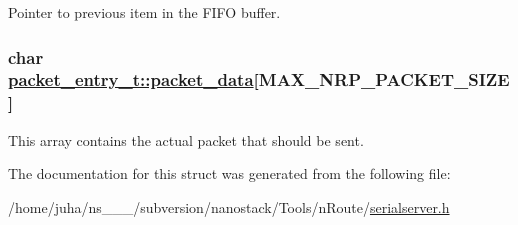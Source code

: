 Pointer to previous item in the FIFO buffer. \hypertarget{structpacket__entry__t_a4ed47e0ce37602056f98befd3340a42}{
\subsubsection[packet\_\-data]{\setlength{\rightskip}{0pt plus 5cm}char \hyperlink{structpacket__entry__t_a4ed47e0ce37602056f98befd3340a42}{packet\_\-entry\_\-t::packet\_\-data}\mbox{[}MAX\_\-NRP\_\-PACKET\_\-SIZE\mbox{]}}}
\label{structpacket__entry__t_a4ed47e0ce37602056f98befd3340a42}


This array contains the actual packet that should be sent. 

The documentation for this struct was generated from the following file:\begin{CompactItemize}
\item 
/home/juha/ns\_\_\_/subversion/nanostack/Tools/n\-Route/\hyperlink{serialserver_8h}{serialserver.h}\end{CompactItemize}

